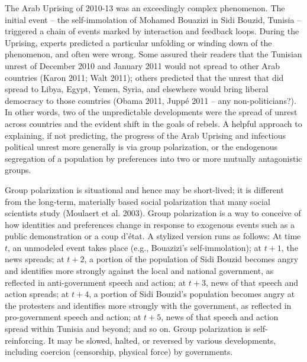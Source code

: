 \documentclass[12pt]{article}
\begin{document}
	The Arab Uprising of 2010-13 was an exceedingly complex phenomenon.  The initial event – the self-immolation of Mohamed Bouazizi in Sidi Bouzid, Tunisia – triggered a chain of events marked by interaction and feedback loops.  During the Uprising, experts predicted a particular unfolding or winding down of the phenomenon, and often were wrong.  Some assured their readers that the Tunisian unrest of December 2010 and January 2011 would not spread to other Arab countries (Karon 2011; Walt 2011); others predicted that the unrest that did spread to Libya, Egypt, Yemen, Syria, and elsewhere would bring liberal democracy to those countries (Obama 2011, Jupp\'{e} 2011 – any non-politicians?).  In other words, two of the unpredictable developments were the spread of unrest across countries and the evident shift in the goals of rebels.  
A helpful approach to explaining, if not predicting, the progress of the Arab Uprising and infectious political unrest more generally is via group polarization, or the endogenous segregation of a population by preferences into two or more mutually antagonistic groups.  

Group polarization is situational and hence may be short-lived; it is different from the long-term, materially based social polarization that many social scientists study (Moulaert et al. 2003).  Group polarization is a way to conceive of how identities and preferences change in response to exogenous events such as a public demonstration or a coup d'\'{e}tat.  A stylized version runs as follows:  At time $t$, an unmodeled event takes place (e.g., Bouazizi's self-immolation); at $t+1$, the news spreads; at $t+2$, a portion of the population of Sidi Bouzid becomes angry and identifies more strongly against the local and national government, as reflected in anti-government speech and action; at $t+3$, news of that speech and action spreads; at $t+4$, a portion of Sidi Bouzid's population becomes angry at the protesters and identifies more strongly with the government, as reflected in pro-government speech and action; at $t+5$, news of that speech and action spread within Tunisia and beyond; and so on.  Group polarization is self-reinforcing.  It may be slowed, halted, or reversed by various developments, including coercion (censorship, physical force) by governments.
\end{document}
